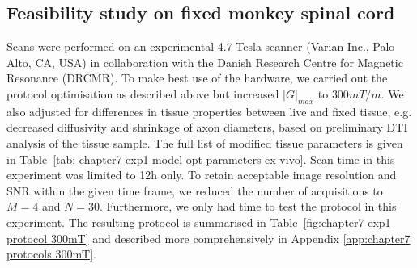 \subsection{Feasibility study on fixed monkey spinal cord}
Scans were performed on an experimental 4.7 Tesla scanner (Varian Inc., Palo Alto, CA, USA) in collaboration with the Danish Research Centre for Magnetic Resonance (DRCMR). To make best use of the hardware, we carried out the protocol optimisation as described above but increased $|G|_{max}$ to $300mT/m$. We also adjusted for differences in tissue properties between live and fixed tissue, e.g. decreased diffusivity and shrinkage of axon diameters, based on preliminary \gls{DTI} analysis of the tissue sample. The full list of modified tissue parameters is given in Table~\ref{tab: chapter7 exp1 model opt parameters ex-vivo}. Scan time in this experiment was limited to 12h only. To retain acceptable image resolution and \gls{SNR} within the given time frame, we reduced the number of acquisitions to $M=4$ and $N=30$. Furthermore, we only had time to test the {\FD} protocol in this experiment. The resulting protocol is summarised in Table~\ref{fig:chapter7 exp1 protocol 300mT} and described more comprehensively in Appendix \ref{app:chapter7 protocols 300mT}. 
